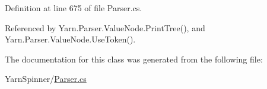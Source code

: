 Definition at line 675 of file Parser.\-cs.



Referenced by Yarn.\-Parser.\-Value\-Node.\-Print\-Tree(), and Yarn.\-Parser.\-Value\-Node.\-Use\-Token().



The documentation for this class was generated from the following file\-:\begin{DoxyCompactItemize}
\item 
Yarn\-Spinner/\hyperlink{a00313}{Parser.\-cs}\end{DoxyCompactItemize}

